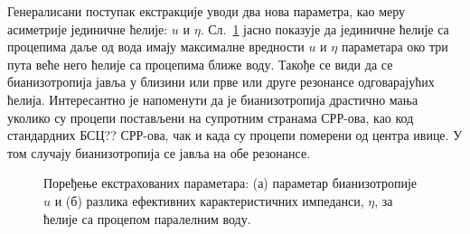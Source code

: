 Генералисани поступак екстракције уводи два нова параметра, као меру асиметрије јединичне ћелије: $u$ и $\eta$. Сл.~\ref{fig12} јасно показује да јединичне ћелије са процепима даље од вода имају максималне вредности $u$ и $\eta$ параметара око три пута веће него ћелије са процепима ближе воду. Такође се види да се бианизотропија јавља у близини или прве или друге резонансе одговарајућих ћелија. Интересантно је напоменути да је бианизотропија драстично мања уколико су процепи постављени на супротним странама СРР-ова, као код стандардних БСЦ?? СРР-ова, чак и када су процепи померени од центра ивице. У том случају бианизотропија се јавља на обе резонансе.
\begin{figure}[!t]
\centering
{}
\caption{Поређење екстрахованих параметара: (а) параметар бианизотропије $u$ и (б) разлика ефективних карактеристичних импеданси, $\eta$, за ћелије са процепом паралелним воду.}
\label{fig12}
\end{figure} 

